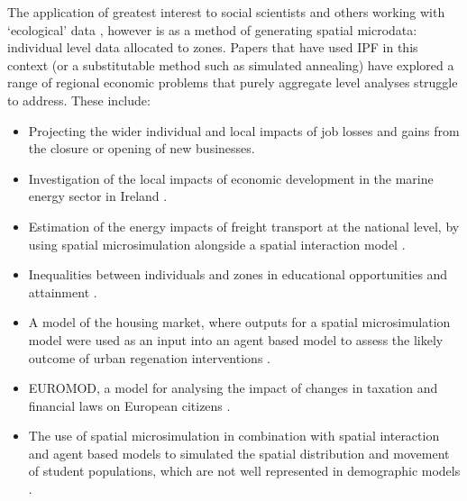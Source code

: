 \documentclass[a4paper,10pt]{article}
\begin{document}
The application of greatest interest to social scientists and others working
with `ecological' data \citep{Openshaw1984}, however is as a method of
generating spatial microdata: individual level data allocated to zones.
Papers that have used IPF in this context (or a substitutable method such as simulated annealing)
have explored a range of regional economic problems that purely aggregate level analyses struggle to address.
These include:
\begin{itemize}
 \item Projecting the wider individual and local impacts
of job losses and gains from the closure \citep{Ballas2006}
or opening \citep{VanLeeuwen2010} of new businesses.
\item Investigation of the local impacts of economic development
in the marine energy sector in Ireland \citep{Morrissey2013a}.
\item Estimation of the energy impacts of freight transport at the
national level, by using spatial microsimulation alongside
a spatial interaction model \citep{Zuo2013a}.
\item Inequalities between individuals and zones in educational opportunities
and attainment \citep{Kavroudakis2012}.
\item A model of the housing market, where outputs
for a spatial microsimulation model were used as an input into
an agent based model to assess the likely outcome of urban regenation
interventions \citep{jordan2011agent}.
\item EUROMOD, a model for analysing the impact of changes
in taxation and financial laws on European citizens \citep{sutherland2013euromod}.
\item The use of spatial microsimulation in combination with
spatial interaction and agent based models to simulated the spatial
distribution and movement of student populations, which
are not well represented in demographic models \citep{Wu2010}.
\end{itemize}

% 
\end{document}
